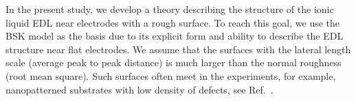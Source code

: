 In the present study, we develop a theory describing the structure of the ionic liquid EDL near electrodes with a rough surface. To reach this goal, we use the BSK model as the basis due to its explicit form and ability to describe the EDL structure near flat electrodes. We assume that the surfaces with the lateral length scale (average peak to peak distance) is much larger than the normal roughness (root mean square). Such surfaces often meet in the experiments, for example, nanopatterned substrates with low density of defects, see Ref.~\cite{sheehan2016layering}. 



  




